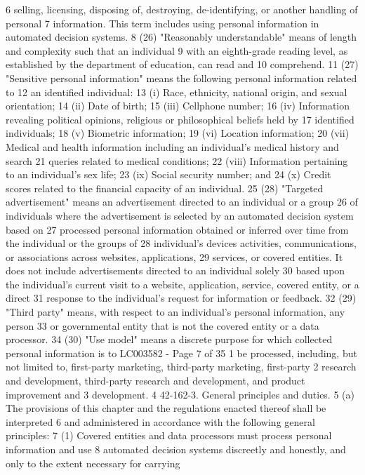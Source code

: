 6 selling, licensing, disposing of, destroying, de-identifying, or another handling of personal
7 information. This term includes using personal information in automated decision systems.
8 (26) "Reasonably understandable" means of length and complexity such that an individual
9 with an eighth-grade reading level, as established by the department of education, can read and
10 comprehend.
11 (27) "Sensitive personal information" means the following personal information related to
12 an identified individual:
13 (i) Race, ethnicity, national origin, and sexual orientation;
14 (ii) Date of birth;
15 (iii) Cellphone number;
16 (iv) Information revealing political opinions, religious or philosophical beliefs held by
17 identified individuals;
18 (v) Biometric information;
19 (vi) Location information;
20 (vii) Medical and health information including an individual's medical history and search
21 queries related to medical conditions;
22 (viii) Information pertaining to an individual's sex life;
23 (ix) Social security number; and
24 (x) Credit scores related to the financial capacity of an individual.
25 (28) "Targeted advertisement" means an advertisement directed to an individual or a group
26 of individuals where the advertisement is selected by an automated decision system based on
27 processed personal information obtained or inferred over time from the individual or the groups of
28 individual's devices activities, communications, or associations across websites, applications,
29 services, or covered entities. It does not include advertisements directed to an individual solely
30 based upon the individual's current visit to a website, application, service, covered entity, or a direct
31 response to the individual's request for information or feedback.
32 (29) "Third party" means, with respect to an individual's personal information, any person
33 or governmental entity that is not the covered entity or a data processor.
34 (30) "Use model" means a discrete purpose for which collected personal information is to 
LC003582 - Page 7 of 35
1 be processed, including, but not limited to, first-party marketing, third-party marketing, first-party
2 research and development, third-party research and development, and product improvement and
3 development.
4 42-162-3. General principles and duties.
5 (a) The provisions of this chapter and the regulations enacted thereof shall be interpreted
6 and administered in accordance with the following general principles:
7 (1) Covered entities and data processors must process personal information and use
8 automated decision systems discreetly and honestly, and only to the extent necessary for carrying
